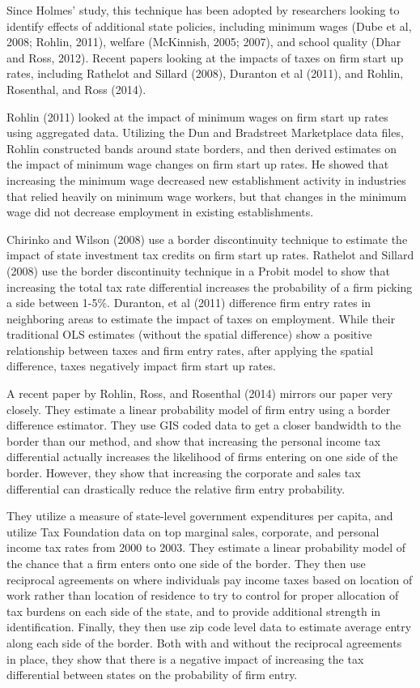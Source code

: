 \documentclass[12pt,a4paper]{article}
\begin{document}
Since Holmes' study, this technique has been adopted by researchers looking to identify effects of additional state policies, including minimum wages (Dube et al, 2008; Rohlin, 2011), welfare (McKinnish, 2005; 2007), and school quality (Dhar and Ross, 2012). Recent papers looking at the impacts of taxes on firm start up rates, including Rathelot and Sillard (2008), Duranton et al (2011), and Rohlin, Rosenthal, and Ross (2014). 

Rohlin (2011) looked at the impact of minimum wages on firm start up rates using aggregated data. Utilizing the Dun and Bradstreet Marketplace data files, Rohlin constructed bands around state borders, and then derived estimates on the impact of minimum wage changes on firm start up rates. He showed that increasing the minimum wage decreased new establishment activity in industries that relied heavily on minimum wage workers, but that changes in the minimum wage did not decrease employment in existing establishments. 

Chirinko and Wilson (2008) use a border discontinuity technique to estimate the impact of state investment tax credits on firm start up rates. Rathelot and Sillard (2008) use the border discontinuity technique in a Probit model to show that increasing the total tax rate differential increases the probability of a firm picking a side between 1-5\%. Duranton, et al (2011)  difference firm entry rates in neighboring areas to estimate the impact of taxes on employment. While their  traditional OLS estimates (without the spatial difference)  show a positive relationship between taxes and firm entry rates, after applying the spatial difference, taxes negatively impact firm start up rates. 

A recent paper by Rohlin, Ross, and Rosenthal (2014) mirrors our paper very closely. They estimate a linear probability model of firm entry using a border difference estimator. They use GIS coded data to get a closer bandwidth to the border than our method, and show that increasing the personal income tax differential actually increases the likelihood of firms entering on one side of the border. However, they show that increasing the corporate and sales tax differential can drastically reduce the relative firm entry probability.

They utilize a measure of state-level government expenditures per capita, and utilize Tax Foundation data on top marginal sales, corporate, and personal income tax rates from 2000 to 2003. They estimate a linear probability model of the chance that a firm enters onto one side of the border. They then use reciprocal agreements on where individuals pay income taxes based on location of work rather than location of residence to try to control for proper allocation of tax burdens on each side of the state, and to provide additional strength in identification. Finally, they then use zip code level data to estimate average entry along each side of the border. Both with and without the reciprocal agreements in place, they show that there is a negative impact of increasing the tax differential between states on the probability of firm entry.
\end{document}
